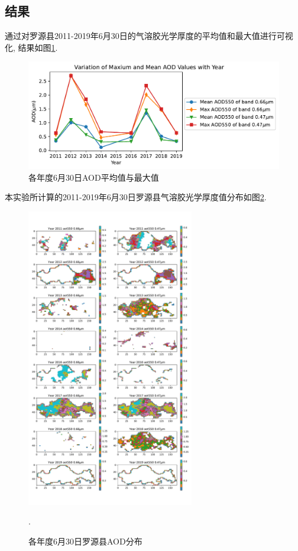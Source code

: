 \documentclass{ctexart}
\begin{document}
\begin{sloppypar}
\subsection{结果}
通过对罗源县2011-2019年6月30日的气溶胶光学厚度的平均值和最大值进行可视化, 结果如图\ref{mean-max-aod}.
\begin{figure}[h]\centering
\includegraphics[width=.7\textwidth]{./src/stat.pdf}
\caption{各年度6月30日AOD平均值与最大值}\label{mean-max-aod}
\end{figure}
本实验所计算的2011-2019年6月30日罗源县气溶胶光学厚度值分布如图\ref*{res}.
\begin{figure}[!htbp]
\centering\includegraphics[width=0.65\textwidth]{./src/res2.pdf}
\caption{各年度6月30日罗源县AOD分布}\label{res}. 
\end{figure}

\end{sloppypar}
\end{document}
